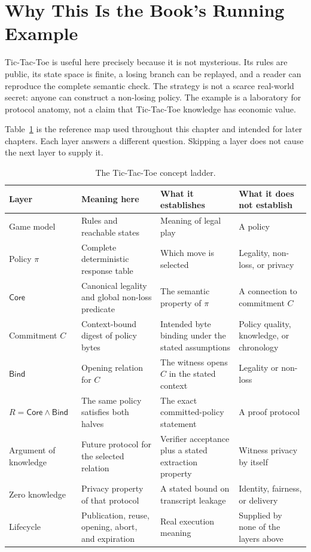 \section{Why This Is the Book's Running Example}
\label{sec:ttt-running-example}

Tic-Tac-Toe is useful here precisely because it is not mysterious. Its rules
are public, its state space is finite, a losing branch can be replayed, and a
reader can reproduce the complete semantic check. The strategy is not a scarce
real-world secret: anyone can construct a non-losing policy. The example is a
laboratory for protocol anatomy, not a claim that Tic-Tac-Toe knowledge has
economic value.

Table~\ref{tab:ttt-concept-ladder} is the reference map used throughout this
chapter and intended for later chapters. Each layer answers a different
question. Skipping a layer does not cause the next layer to supply it.

\begin{table}[H]
\centering
\footnotesize
\begin{tabular}{@{}
>{\raggedright\arraybackslash}p{}
>{\raggedright\arraybackslash}p{}
>{\raggedright\arraybackslash}p{}
>{\raggedright\arraybackslash}p{}@{}}
\hline
Layer & Meaning here & What it establishes & What it does not establish \\
\hline
Game model & Rules and reachable states & Meaning of legal play & A policy \\
Policy $\pi$ & Complete deterministic response table & Which move is selected & Legality, non-loss, or privacy \\
$\mathsf{Core}$ & Canonical legality and global non-loss predicate & The semantic property of $\pi$ & A connection to commitment $C$ \\
Commitment $C$ & Context-bound digest of policy bytes & Intended byte binding under the stated assumptions & Policy quality, knowledge, or chronology \\
$\mathsf{Bind}$ & Opening relation for $C$ & The witness opens $C$ in the stated context & Legality or non-loss \\
$R=\mathsf{Core}\land\mathsf{Bind}$ & The same policy satisfies both halves & The exact committed-policy statement & A proof protocol \\
Argument of knowledge & Future protocol for the selected relation & Verifier acceptance plus a stated extraction property & Witness privacy by itself \\
Zero knowledge & Privacy property of that protocol & A stated bound on transcript leakage & Identity, fairness, or delivery \\
Lifecycle & Publication, reuse, opening, abort, and expiration & Real execution meaning & Supplied by none of the layers above \\
\hline
\end{tabular}
\caption{The Tic-Tac-Toe concept ladder.}
\label{tab:ttt-concept-ladder}
\end{table}

